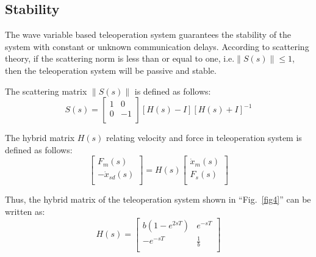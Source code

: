 \subsection{Stability}
The wave variable based teleoperation system
guarantees the stability of the system with constant or unknown communication delays.
According to scattering theory\cite{b7},
if the scattering norm is less than or equal to one, i.e.$\left\| S(s) \right\|\le 1$,
then the teleoperation system will be passive and stable.
\par The scattering matrix $\left\| S(s) \right\|$ is defined as follows:
\begin{equation}
    S(s)=\left[ \begin{matrix}
            1 & 0  \\
            0 & -1 \\
        \end{matrix} \right]\left[ H(s)-I \right]{{\left[ H(s)+I \right]}^{-1}}\label{eq15}
\end{equation}
\par The hybrid matrix $H(s)$ relating velocity and force in teleoperation system is defined as follows:
\begin{equation}
    \left[ \begin{matrix}
            {{F}_{m}}(s)           \\
            -{{{\dot{x}}}_{sd}}(s) \\
        \end{matrix} \right]=H(s)\left[ \begin{matrix}
            {{{\dot{x}}}_{m}}(s) \\
            {{F}_{s}}(s)         \\
        \end{matrix} \right]\label{eq16}
\end{equation}
\par Thus, the hybrid matrix of the teleoperation system shown in ``Fig.~\ref{fig4}'' can be written as:
\begin{equation}
    H(s)=\left[ \begin{matrix}
            b(1-{{e}^{2sT}}) & {{e}^{-sT}} \\
            -{{e}^{-sT}}     & \frac{1}{b} \\
        \end{matrix} \right] \label{eq17}
\end{equation}


